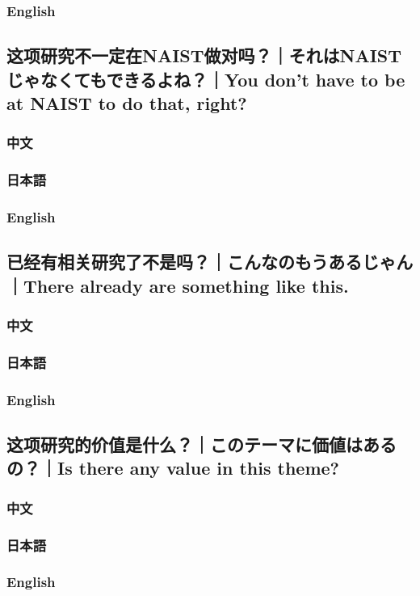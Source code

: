 \documentclass[lang=cn,11pt,a4paper]{elegantpaper}
\begin{document}
\subsubsection{English}

\subsection{这项研究不一定在NAIST做对吗？｜それはNAISTじゃなくてもできるよね？｜You don't have to be at NAIST to do that, right?}
\subsubsection{中文}
\subsubsection{日本語}
\subsubsection{English}

\subsection{已经有相关研究了不是吗？｜こんなのもうあるじゃん｜There already are something like this.}
\subsubsection{中文}
\subsubsection{日本語}
\subsubsection{English}

\subsection{这项研究的价值是什么？｜このテーマに価値はあるの？｜Is there any value in this theme?}
\subsubsection{中文}
\subsubsection{日本語}
\subsubsection{English}
\end{document}

